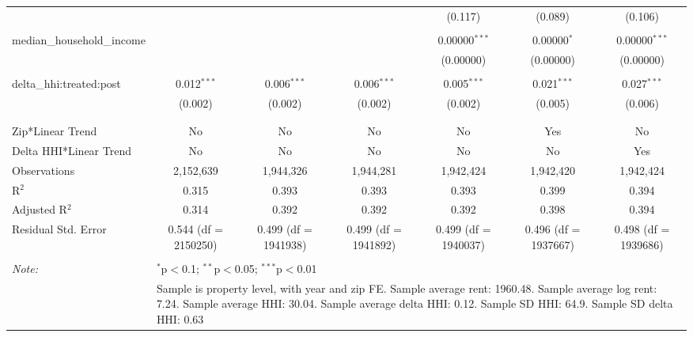 \begin{table}[H]
{\begin{tabular}{@{\extracolsep{5pt}}lcccccc}
   &  &  &  & (0.117) & (0.089) & (0.106) \\  

   & & & & & & \\  

  median\_household\_income &  &  &  & 0.00000$^{***}$ & 0.00000$^{*}$ & 0.00000$^{***}$ \\  

   &  &  &  & (0.00000) & (0.00000) & (0.00000) \\  

   & & & & & & \\  

  delta\_hhi:treated:post & 0.012$^{***}$ & 0.006$^{***}$ & 0.006$^{***}$ & 0.005$^{***}$ & 0.021$^{***}$ & 0.027$^{***}$ \\  

   & (0.002) & (0.002) & (0.002) & (0.002) & (0.005) & (0.006) \\  

   & & & & & & \\  

 \hline \\[-1.8ex]  

 Zip*Linear Trend & No & No & No & No & Yes & No \\  

 Delta HHI*Linear Trend & No & No & No & No & No & Yes \\  

 Observations & 2,152,639 & 1,944,326 & 1,944,281 & 1,942,424 & 1,942,420 & 1,942,424 \\  

 R$^{2}$ & 0.315 & 0.393 & 0.393 & 0.393 & 0.399 & 0.394 \\  

 Adjusted R$^{2}$ & 0.314 & 0.392 & 0.392 & 0.392 & 0.398 & 0.394 \\  

 Residual Std. Error & 0.544 (df = 2150250) & 0.499 (df = 1941938) & 0.499 (df = 1941892) & 0.499 (df = 1940037) & 0.496 (df = 1937667) & 0.498 (df = 1939686) \\  

 \hline  

 \hline \\[-1.8ex]  

 \textit{Note:}  & \multicolumn{6}{l}{$^{*}$p$<$0.1; $^{**}$p$<$0.05; $^{***}$p$<$0.01} \\  

  & \multicolumn{6}{l}{Sample is property level, with year and zip FE. Sample average rent: 1960.48. Sample average log rent: 7.24. Sample average HHI: 30.04. Sample average delta HHI: 0.12. Sample SD HHI: 64.9. Sample SD delta HHI: 0.63} \\  

 \end{tabular}}  

 \end{table}  

